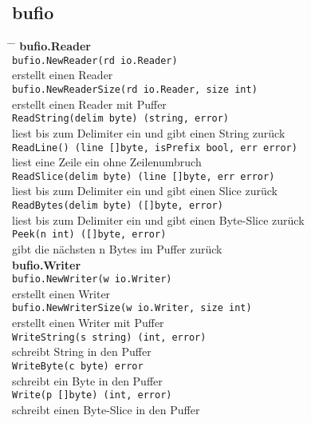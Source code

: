 \documentclass[twoside,a4paper,12pt]{article}
\begin{document}
\subsection{bufio}
\begin{tabbing}
 \hspace{2mm} \= \hspace{50mm} \= \kill
 \> \textbf{bufio.Reader} \\ 
 \> \verb|bufio.NewReader(rd io.Reader)| \\ 
 \> erstellt einen Reader \\
 \> \verb|bufio.NewReaderSize(rd io.Reader, size int)| \\ 
 \> erstellt einen Reader mit Puffer \\ 
 \> \verb|ReadString(delim byte) (string, error)| \\ 
 \> liest bis zum Delimiter ein und gibt einen String zurück \\  
 \> \verb|ReadLine() (line []byte, isPrefix bool, err error)| \\ 
 \> liest eine Zeile ein ohne Zeilenumbruch \\
 \> \verb|ReadSlice(delim byte) (line []byte, err error)| \\ 
 \> liest bis zum Delimiter ein und gibt einen Slice zurück \\ 
 \> \verb|ReadBytes(delim byte) ([]byte, error)| \\ 
 \> liest bis zum Delimiter ein und gibt einen Byte-Slice zurück \\ 
 \> \verb|Peek(n int) ([]byte, error)| \\ 
 \> gibt die nächsten n Bytes im Puffer zurück \\ 
 \> \textbf{bufio.Writer} \\ 
 \> \verb|bufio.NewWriter(w io.Writer)| \\ 
 \> erstellt einen Writer \\ 
 \> \verb|bufio.NewWriterSize(w io.Writer, size int)| \\ 
 \> erstellt einen Writer mit Puffer \\ 
 \> \verb|WriteString(s string) (int, error)| \\ 
 \> schreibt String in den Puffer \\ 
 \> \verb|WriteByte(c byte) error| \\ 
 \> schreibt ein Byte in den Puffer \\ 
 \> \verb|Write(p []byte) (int, error)| \\ 
 \> schreibt einen Byte-Slice in den Puffer \\ 

\end{tabbing}
\end{document}
